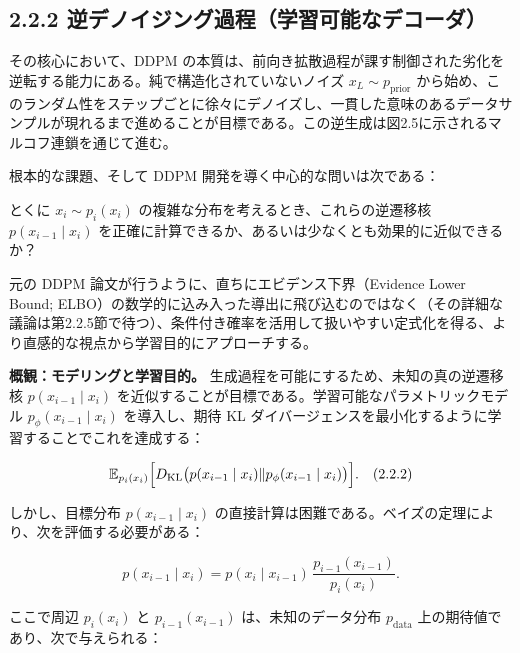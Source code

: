 \subsection*{2.2.2 逆デノイジング過程（学習可能なデコーダ）}


その核心において、DDPM の本質は、前向き拡散過程が課す制御された劣化を逆転する能力にある。純で構造化されていないノイズ $x_L\sim p_{\mathrm{prior}}$ から始め、このランダム性をステップごとに徐々にデノイズし、一貫した意味のあるデータサンプルが現れるまで進めることが目標である。この逆生成は図2.5に示されるマルコフ連鎖を通じて進む。



根本的な課題、そして DDPM 開発を導く中心的な問いは次である：

\begin{propositionbox}[問い 2.2.1]
とくに $x_i\sim p_i(x_i)$ の複雑な分布を考えるとき、これらの逆遷移核 $p(x_{i-1}\mid x_i)$ を正確に計算できるか、あるいは少なくとも効果的に近似できるか？
\end{propositionbox}


元の DDPM 論文が行うように、直ちにエビデンス下界（Evidence Lower Bound; ELBO）の数学的に込み入った導出に飛び込むのではなく（その詳細な議論は第2.2.5節で待つ）、条件付き確率を活用して扱いやすい定式化を得る、より直感的な視点から学習目的にアプローチする。

\textbf{概観：モデリングと学習目的。} 生成過程を可能にするため、未知の真の逆遷移核 $p(x_{i-1}\mid x_i)$ を近似することが目標である。学習可能なパラメトリックモデル $p_\phi(x_{i-1}\mid x_i)$ を導入し、期待 KL ダイバージェンスを最小化するように学習することでこれを達成する：

\[
\mathbb{E}_{p_i(x_i)}\Bigl[D_{\mathrm{KL}}\bigl(p(x_{i-1}\mid x_i)\Vert p_\phi(x_{i-1}\mid x_i)\bigr)\Bigr]. \quad (2.2.2)
\]


しかし、目標分布 $p(x_{i-1}\mid x_i)$ の直接計算は困難である。ベイズの定理により、次を評価する必要がある：

\[
p(x_{i-1}\mid x_i) = p(x_i\mid x_{i-1})\,\frac{p_{i-1}(x_{i-1})}{p_i(x_i)}.
\]


ここで周辺 $p_i(x_i)$ と $p_{i-1}(x_{i-1})$ は、未知のデータ分布 $p_{\mathrm{data}}$ 上の期待値であり、次で与えられる：

